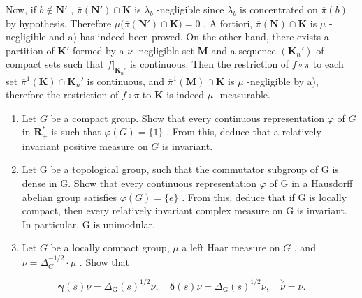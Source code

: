 Now, if \(b \notin \mathbf{N}'\) , \(\overline{\pi}(\mathbf{N}') \cap \mathbf{K}\) is \(\lambda_b\) -negligible since \(\lambda_b\) is concentrated on \(\overline{\pi}(b)\) by hypothesis. Therefore \(\mu\big(\overline{\pi}(\mathbf{N}') \cap \mathbf{K}\big) = 0\) . A fortiori, \(\overline{\pi}(\mathbf{N}) \cap \mathbf{K}\) is \(\mu\) -negligible and a) has indeed been proved. On the other hand, there exists a partition of \(\mathbf{K}'\) formed by a \(\nu\) -negligible set \(\mathbf{M}\) and a sequence \((\mathbf{K}_n')\) of compact sets such that \(f|_{\mathbf{K}_n'}\) is continuous. Then the restriction of \(f \circ \pi\) to each set \(\overline{\pi}^1(\mathbf{K}) \cap \mathbf{K}_n'\) is continuous, and \(\overline{\pi}^1(\mathbf{M}) \cap \mathbf{K}\) is \(\mu\) -negligible by a), therefore the restriction of \(f \circ \pi\) to \(\mathbf{K}\) is indeed \(\mu\) -measurable.


\exercisesection{}

\begin{enumerate}
\def\labelenumi{\arabic{enumi})}
\item
  Let \(G\) be a compact group. Show that every continuous representation \(\varphi\) of \(G\) in \(\mathbf{R}_+^*\) is such that \(\varphi(G) = \{1\}\) . From this, deduce that a relatively invariant positive measure on \(G\) is invariant.
\item
  Let G be a topological group, such that the commutator subgroup of G is dense in G. Show that every continuous representation \(\varphi\) of G in a Hausdorff abelian group satisfies \(\varphi(G) = \{e\}\) . From this, deduce that if G is locally compact, then every relatively invariant complex measure on G is invariant. In particular, G is unimodular.
\item
  Let \(G\) be a locally compact group, \(\mu\) a left Haar measure on \(G\) , and \(\nu = \Delta_G^{-1/2} \cdot \mu\) . Show that
\end{enumerate}

\[
\boldsymbol {\gamma} (s) \nu = \Delta_ {\mathrm{G}} (s) ^ {1 / 2} \nu , \quad \boldsymbol {\delta} (s) \nu = \Delta_ {\mathrm{G}} (s) ^ {1 / 2} \nu , \quad \stackrel {\vee} {\nu} = \nu .
\]

